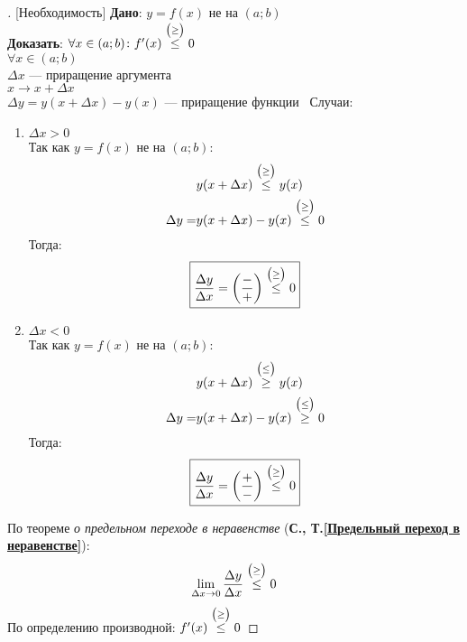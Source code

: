 \begin{proof}[][Необходимость]
	\textbf{Дано}: $y=f(x)$ не  на $(a;b)$\\
	\textbf{Доказать}: $\forall x \in (a;b)\colon f'(x) \overset{\scriptsize{\big(\ge \big)}}{\le} 0$\\
	$\forall x \in (a;b)$\\
	$\Delta x$ --- приращение аргумента\\
	$x \to x + \Delta x$\\
	$\Delta y = y(x + \Delta x) - y(x)$ --- приращение функции\
	\newpage
	\noindent Случаи:
	\begin{enumerate}
		\item $\Delta x > 0$\\
		      Так как $y=f(x)$ не  на $(a;b)$: \vspace{-\topsep}
		      \begin{align*}
			                 & y(x+\Delta x) \overset{\scriptsize{\big(\ge \big)}}{\le} y(x)       \\
			      \Delta y = & y(x + \Delta x) - y(x) \overset{\scriptsize{\big(\ge \big)}}{\le} 0
		      \end{align*} \vspace{-\topsep}
		      Тогда:
		      \begin{gather*}
			      \boxed{\frac{\Delta y}{\Delta x} = \left(\frac{-}{+}\right) \overset{\scriptsize{\big(\ge \big)}}{\le} 0}
		      \end{gather*}
		\item $\Delta x < 0$\\
		      Так как $y=f(x)$ не  на $(a;b)$: \vspace{-\topsep}
		      \begin{align*}
			                 & y(x+\Delta x) \overset{\scriptsize{\big(\le \big)}}{\ge} y(x)       \\
			      \Delta y = & y(x + \Delta x) - y(x) \overset{\scriptsize{\big(\le \big)}}{\ge} 0
		      \end{align*} \vspace{-\topsep}
		      Тогда:
		      \begin{gather*}
			      \boxed{\frac{\Delta y}{\Delta x} = \left(\frac{+}{-}\right) \overset{\scriptsize{\big(\ge \big)}}{\le} 0}
		      \end{gather*}
	\end{enumerate}
	По теореме \textit{о предельном переходе в неравенстве} (\textbf{С.\pageref{Предельный переход в неравенстве}, Т.\ref{Предельный переход в неравенстве}}):
	\begin{gather*}
		\lim\limits_{\Delta x \to 0} \frac{\Delta y}{\Delta x} \overset{\scriptsize{\big(\ge \big)}}{\le} 0
	\end{gather*}
	По определению производной: $f'(x) \overset{\scriptsize{\big(\ge \big)}}{\le} 0$
\end{proof}
